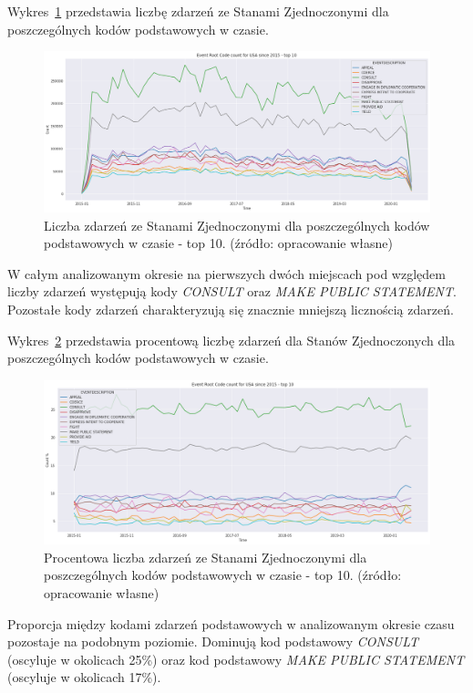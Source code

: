 \documentclass[11pt]{report}
\begin{document}
    Wykres~\ref{fig:USAPERCinTIME} przedstawia liczbę zdarzeń ze Stanami Zjednoczonymi dla poszczególnych kodów podstawowych w czasie.
    \begin{figure}[!htp]
        \centering
        \includegraphics[width=\linewidth]{fig/USA/USAERCinTIME.png}
        \caption{Liczba zdarzeń ze Stanami Zjednoczonymi dla poszczególnych kodów podstawowych w czasie - top 10. (źródło: opracowanie własne)}
        \label{fig:USAPERCinTIME}
    \end{figure}
    W całym analizowanym okresie na pierwszych dwóch miejscach pod względem liczby zdarzeń występują kody \textit{CONSULT} oraz \textit{MAKE PUBLIC STATEMENT}.
    Pozostałe kody zdarzeń charakteryzują się znacznie mniejszą licznością zdarzeń.

    Wykres~\ref{fig:USAPERCpercinTIME} przedstawia procentową liczbę zdarzeń dla Stanów Zjednoczonych dla poszczególnych kodów podstawowych w czasie.
    \begin{figure}[!htp]
        \centering
        \includegraphics[width=\linewidth]{fig/USA/USAERCpercinTIME.png}
        \caption{Procentowa liczba zdarzeń ze Stanami Zjednoczonymi dla poszczególnych kodów podstawowych w czasie - top 10. (źródło: opracowanie własne)}
        \label{fig:USAPERCpercinTIME}
    \end{figure}
    Proporcja między kodami zdarzeń podstawowych w analizowanym okresie czasu pozostaje na podobnym poziomie.
    Dominują kod podstawowy \textit{CONSULT} (oscyluje w okolicach 25\%) oraz kod podstawowy \textit{MAKE PUBLIC STATEMENT} (oscyluje w okolicach 17\%).
\end{document}
